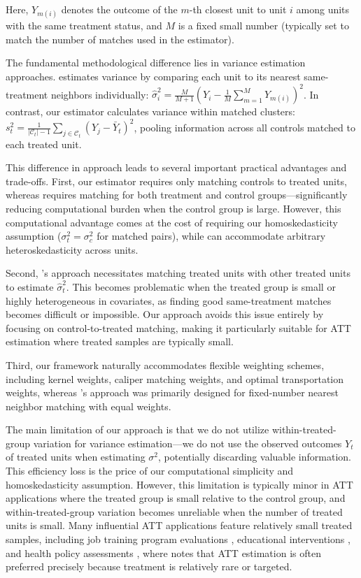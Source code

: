 \documentclass{mytemplate}
\begin{document}
Here, $Y_{m(i)}$ denotes the outcome of the $m$-th closest unit to unit $i$ among units with the same treatment status, and $M$ is a fixed small number (typically set to match the number of matches used in the estimator).

The fundamental methodological difference lies in variance estimation approaches. \cite{abadie2006large} estimates variance by comparing each unit to its nearest same-treatment neighbors individually: $\hat\sigma_i^2 = \frac{M}{M+1} \left(Y_i - \frac{1}{M} \sum_{m=1}^{M} Y_{m(i)}\right)^2$. In contrast, our estimator calculates variance within matched clusters: $s^2_t = \frac{1}{|\mathcal{C}_t| - 1} \sum_{j \in \mathcal{C}_t} \left(Y_{j} - \bar{Y}_t\right)^2$, pooling information across all controls matched to each treated unit.

This difference in approach leads to several important practical advantages and trade-offs. First, our estimator requires only matching controls to treated units, whereas \cite{abadie2006large} requires matching for both treatment and control groups—significantly reducing computational burden when the control group is large. However, this computational advantage comes at the cost of requiring our homoskedasticity assumption ($\sigma_t^2 = \sigma_c^2$ for matched pairs), while \cite{abadie2006large} can accommodate arbitrary heteroskedasticity across units. 

Second, \cite{abadie2006large}'s approach necessitates matching treated units with other treated units to estimate $\hat\sigma_t^2$. This becomes problematic when the treated group is small or highly heterogeneous in covariates, as finding good same-treatment matches becomes difficult or impossible. Our approach avoids this issue entirely by focusing on control-to-treated matching, making it particularly suitable for ATT estimation where treated samples are typically small.

Third, our framework naturally accommodates flexible weighting schemes, including kernel weights, caliper matching weights, and optimal transportation weights, whereas \cite{abadie2006large}'s approach was primarily designed for fixed-number nearest neighbor matching with equal weights.

The main limitation of our approach is that we do not utilize within-treated-group variation for variance estimation—we do not use the observed outcomes $Y_t$ of treated units when estimating $\sigma^2$, potentially discarding valuable information. This efficiency loss is the price of our computational simplicity and homoskedasticity assumption. However, this limitation is typically minor in ATT applications where the treated group is small relative to the control group, and within-treated-group variation becomes unreliable when the number of treated units is small. Many influential ATT applications feature relatively small treated samples, including job training program evaluations \citep{lalonde1986evaluating}, educational interventions \citep{abadie2002instrumental}, and health policy assessments \citep{keele_hospital_2023}, where \cite{imbens2004nonparametric} notes that ATT estimation is often preferred precisely because treatment is relatively rare or targeted.
\end{document}
